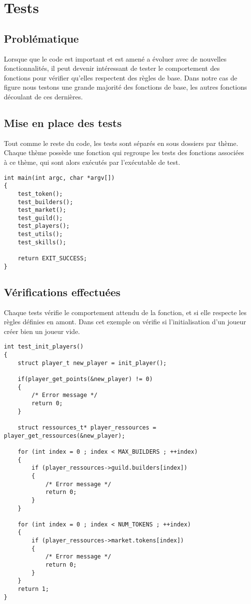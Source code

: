 \section{Tests}
\label{tests}

\subsection*{Problématique}

Lorsque que le code est important et est amené a évoluer avec de nouvelles fonctionnalités, il peut devenir intéressant de tester le comportement des fonctions pour vérifier qu'elles respectent des règles de base. Dans notre cas de figure nous testons une grande majorité des fonctions de base, les autres fonctions découlant de ces dernières.

\subsection{Mise en place des tests}

Tout comme le reste du code, les tests sont séparés en sous dossiers par thème. Chaque thème possède une fonction qui regroupe les tests des fonctions associées à ce thème, qui sont alors exécutés par l'exécutable de test.


\begin{lstlisting}[frame=single, caption={Exécution des tests}]
int main(int argc, char *argv[])
{
	test_token();
	test_builders();
	test_market();
	test_guild();
	test_players();
	test_utils();
	test_skills();
 
	return EXIT_SUCCESS;
}
\end{lstlisting}
\subsection{Vérifications effectuées}

Chaque tests vérifie le comportement attendu de la fonction, et si elle respecte les règles définies en amont. Dans cet exemple on vérifie si l'initialisation d'un joueur créer bien un joueur vide.

\begin{lstlisting}[frame=single, caption={Test init player}]
int test_init_players()
{
	struct player_t new_player = init_player();

	if(player_get_points(&new_player) != 0)
	{
		/* Error message */
		return 0;
	}

	struct ressources_t* player_ressources = player_get_ressources(&new_player);
	
	for (int index = 0 ; index < MAX_BUILDERS ; ++index)
	{
		if (player_ressources->guild.builders[index]) 
		{
			/* Error message */
			return 0;
		}
	}

	for (int index = 0 ; index < NUM_TOKENS ; ++index)
	{
		if (player_ressources->market.tokens[index]) 
		{
			/* Error message */
			return 0;
		}
	}
	return 1;
}
\end{lstlisting}